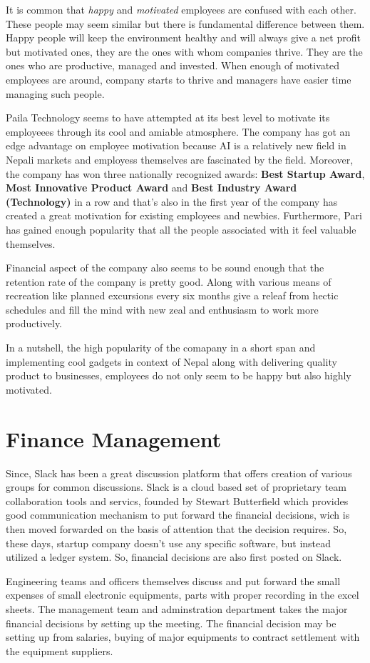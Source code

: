 \documentclass[12pt,a4paper]{scrreprt}
\begin{document}
It is common that \textit{happy} and \textit{motivated} employees are confused with each other. These people may seem similar but there is fundamental difference between them. Happy people will keep the environment healthy and will always give a net profit but motivated ones, they are the ones with whom companies thrive. They are the ones who are productive, managed and invested. When enough of motivated employees are around, company starts to thrive and managers have easier time managing such people. 

Paila Technology seems to have attempted at its best level to motivate its employeees through its cool and amiable atmosphere. The company has got an edge advantage on employee motivation because AI is a relatively new field in Nepali markets and employess themselves are fascinated by the field. Moreover, the company has won three nationally recognized awards: \textbf{Best Startup Award}, \textbf{Most Innovative Product Award} and \textbf{Best Industry Award (Technology)} in a row and that's also in the first year of the company has created a great motivation for existing employees and newbies. Furthermore, Pari has gained enough popularity that all the people associated with it feel valuable themselves.

Financial aspect of the company also seems to be sound enough that the retention rate of the company is pretty good. Along with various means of recreation like planned excursions every six months give a releaf from hectic schedules and fill the mind with new zeal and enthusiasm to work more productively.
 
In a nutshell, the high popularity of the comapany in a short span and implementing cool gadgets in context of Nepal along with delivering quality product to businesses, employees do not only seem to be happy but also highly motivated.

\chapter{Finance Management}
Since, Slack has been a great discussion platform that offers creation of various groups for common discussions. Slack is a cloud based set of proprietary team collaboration tools and servics, founded by Stewart Butterfield which provides good communication mechanism to put forward the financial decisions, wich is then moved forwarded on the basis of attention that the decision requires. So, these days, startup company doesn't use any specific software, but instead utilized a ledger system. So, financial decisions are also first posted on Slack.\par
Engineering teams and officers themselves discuss and put forward the small expenses of small electronic equipments, parts with proper recording in the excel sheets. The management team and adminstration department takes the major financial decisions by setting up the meeting. The financial decision may be setting up from salaries, buying of major equipments to contract settlement with the equipment suppliers.
\end{document}
